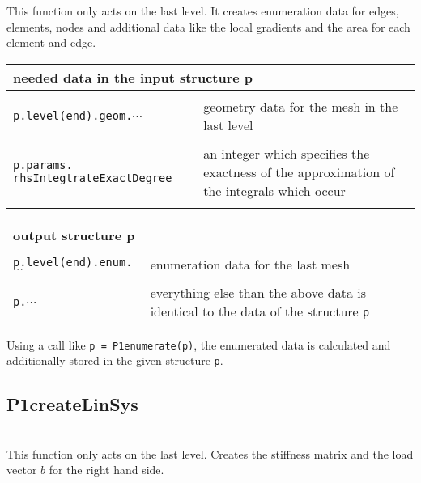 \noindent This function only acts on the last level.
It creates enumeration data for edges, elements, nodes
and additional data like the local gradients and the area
for each element and edge.

\begin{longtable}[h]{p{5.5cm}p{6cm}}
\multicolumn{2}{l}{needed data in the input structure p}\\\hline\\[-1ex]

\verb+p.level(end).geom.+$\cdots$
& geometry data for the mesh in the last level\\
\\
\verb+p.params.+ \verb+rhsIntegtrateExactDegree+
& an integer which specifies the exactness of the approximation of the integrals which occur \\
\\
\end{longtable}

\begin{longtable}[h]{p{5.5cm}p{6cm}}
\multicolumn{2}{l}{output structure p}\\\hline\\[-1ex]

\verb+p.level(end).enum.+$\cdots$ & enumeration data for the last mesh\\
\\
\verb+p.+$\cdots$ & everything else than the above data is identical to the data of the structure \verb+p+ 
\end{longtable}

\noindent Using a call like \verb+p = P1enumerate(p)+, the enumerated data is calculated and additionally stored in the given structure
\verb+p+.


\subsection{P1createLinSys}
\\

\noindent This function only acts on the last level.
Creates the stiffness matrix and the load vector $b$ for the right hand side.

